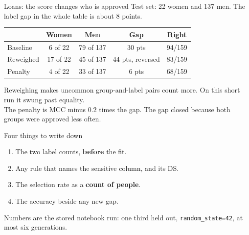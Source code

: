 \documentclass[aspectratio=169,11pt]{beamer}
\begin{document}
\begin{frame}{Loans: the score changes who is approved}
  Test set: 22 women and 137 men. The label gap in the whole table is about 8 points.
  \vspace{0.35em}

  \small
  \renewcommand{\arraystretch}{1.2}
  \begin{tabular}{@{}l c c c c@{}}
    \toprule
     & Women & Men & Gap & Right \\
    \midrule
    Baseline & 6 of 22 & 79 of 137 & 30 pts & 94/159 \\
    Reweighed & 17 of 22 & 45 of 137 & 44 pts, reversed & 83/159 \\
    Penalty & 4 of 22 & 33 of 137 & 6 pts & 68/159 \\
    \bottomrule
  \end{tabular}

  \vspace{0.4em}
  {\small Reweighing makes uncommon group-and-label pairs count more. On this short run it swung past equality.\\
  The penalty is MCC minus \(0.2\) times the gap. The gap closed because both groups were approved less often.}
\end{frame}

\begin{frame}{Four things to write down}
  \begin{enumerate}
    \item The two label counts, \textbf{before} the fit.
    \item Any rule that names the sensitive column, and its DS.
    \item The selection rate as a \textbf{count of people}.
    \item The accuracy beside any new gap.
  \end{enumerate}
  \vfill
  {\small\color{ebdmuted}Numbers are the stored notebook run: one third held out, \texttt{random\_state=42}, at most six generations.}
\end{frame}
\end{document}

